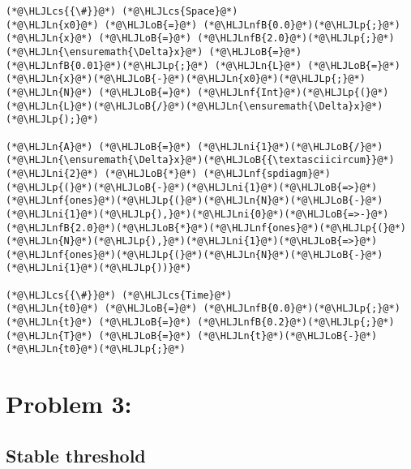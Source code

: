 \documentclass[12pt,a4paper]{article}
\newcommand{\HLJLn}[1]{#1}
\newcommand{\HLJLnf}[1]{\textcolor[RGB]{66,102,213}{#1}}
\newcommand{\HLJLnfB}[1]{\textcolor[RGB]{59,151,46}{#1}}
\newcommand{\HLJLni}[1]{\textcolor[RGB]{59,151,46}{#1}}
\newcommand{\HLJLoB}[1]{\textcolor[RGB]{102,102,102}{\textbf{#1}}}
\newcommand{\HLJLp}[1]{#1}
\newcommand{\HLJLcs}[1]{\textcolor[RGB]{153,153,119}{\textit{#1}}}
\begin{document}
\begin{lstlisting}
(*@\HLJLcs{{\#}}@*) (*@\HLJLcs{Space}@*)
(*@\HLJLn{x0}@*) (*@\HLJLoB{=}@*) (*@\HLJLnfB{0.0}@*)(*@\HLJLp{;}@*) (*@\HLJLn{x}@*) (*@\HLJLoB{=}@*) (*@\HLJLnfB{2.0}@*)(*@\HLJLp{;}@*)
(*@\HLJLn{\ensuremath{\Delta}x}@*) (*@\HLJLoB{=}@*) (*@\HLJLnfB{0.01}@*)(*@\HLJLp{;}@*) (*@\HLJLn{L}@*) (*@\HLJLoB{=}@*) (*@\HLJLn{x}@*)(*@\HLJLoB{-}@*)(*@\HLJLn{x0}@*)(*@\HLJLp{;}@*) (*@\HLJLn{N}@*) (*@\HLJLoB{=}@*) (*@\HLJLnf{Int}@*)(*@\HLJLp{(}@*)(*@\HLJLn{L}@*)(*@\HLJLoB{/}@*)(*@\HLJLn{\ensuremath{\Delta}x}@*)(*@\HLJLp{);}@*) 

(*@\HLJLn{A}@*) (*@\HLJLoB{=}@*) (*@\HLJLni{1}@*)(*@\HLJLoB{/}@*)(*@\HLJLn{\ensuremath{\Delta}x}@*)(*@\HLJLoB{{\textasciicircum}}@*)(*@\HLJLni{2}@*) (*@\HLJLoB{*}@*) (*@\HLJLnf{spdiagm}@*)(*@\HLJLp{(}@*)(*@\HLJLoB{-}@*)(*@\HLJLni{1}@*)(*@\HLJLoB{=>}@*)(*@\HLJLnf{ones}@*)(*@\HLJLp{(}@*)(*@\HLJLn{N}@*)(*@\HLJLoB{-}@*)(*@\HLJLni{1}@*)(*@\HLJLp{),}@*)(*@\HLJLni{0}@*)(*@\HLJLoB{=>-}@*)(*@\HLJLnfB{2.0}@*)(*@\HLJLoB{*}@*)(*@\HLJLnf{ones}@*)(*@\HLJLp{(}@*)(*@\HLJLn{N}@*)(*@\HLJLp{),}@*)(*@\HLJLni{1}@*)(*@\HLJLoB{=>}@*)(*@\HLJLnf{ones}@*)(*@\HLJLp{(}@*)(*@\HLJLn{N}@*)(*@\HLJLoB{-}@*)(*@\HLJLni{1}@*)(*@\HLJLp{))}@*)

(*@\HLJLcs{{\#}}@*) (*@\HLJLcs{Time}@*)
(*@\HLJLn{t0}@*) (*@\HLJLoB{=}@*) (*@\HLJLnfB{0.0}@*)(*@\HLJLp{;}@*) (*@\HLJLn{t}@*) (*@\HLJLoB{=}@*) (*@\HLJLnfB{0.2}@*)(*@\HLJLp{;}@*) 
(*@\HLJLn{T}@*) (*@\HLJLoB{=}@*) (*@\HLJLn{t}@*)(*@\HLJLoB{-}@*)(*@\HLJLn{t0}@*)(*@\HLJLp{;}@*)
\end{lstlisting}


\section{Problem 3:}
\subsection{Stable threshold}
\end{document}
